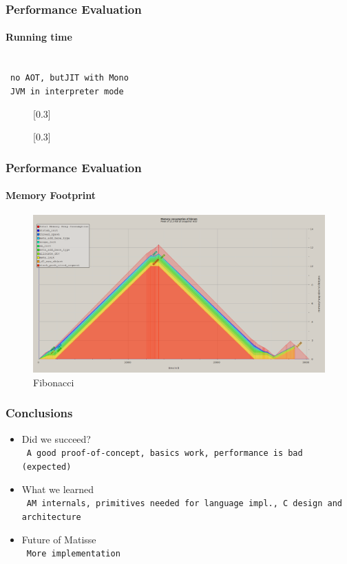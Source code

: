 \documentclass{beamer}
\newcommand{\n}[1]{\leavevmode\\~\texttt{\color{red}\tiny #1}}
\begin{document}
\begin{frame}
  \frametitle{Performance Evaluation}
  \framesubtitle{Running time}

  \n{no AOT, butJIT with Mono}
  \n{JVM in interpreter mode}

  \begin{figure}
    \centering
    \begin{minipage}{.5\textwidth}
      \centering
          \scalebox{0.36}[0.3]{}
    \end{minipage}%
    \begin{minipage}{.5\textwidth}
      \centering
          \scalebox{0.36}[0.3]{}
    \end{minipage}
  \end{figure}
\end{frame}

\begin{frame}
  \frametitle{Performance Evaluation}
  \framesubtitle{Memory Footprint}

  \begin{figure}[H]
    \centering
    \includegraphics[scale=0.23]{../figures/fig-mem}
    \caption{Fibonacci}
  \end{figure}
\end{frame}

\begin{frame}
  \frametitle{Conclusions}

  \begin{itemize}[<+->]
  \item Did we succeed?
    \n{A good proof-of-concept, basics work, performance is bad (expected)}
  \item What we learned
    \n{AM internals, primitives needed for language impl., C design and architecture}
  \item Future of Matisse
    \n{More implementation}
  \end{itemize}
\end{frame}
\end{document}
